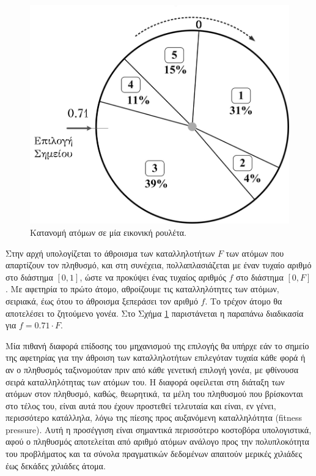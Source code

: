 \begin{figure}[htb]
 \begin{center}
    \includegraphics{./images/rouletteWheelSelection.png}
  \caption{Κατανομή ατόμων σε μία εικονική ρουλέτα.}
  \label{fig:rouletteWheelGA}
 \end{center}
\end{figure}





Στην αρχή υπολογίζεται το άθροισμα των καταλληλοτήτων $F$ των ατόμων που απαρτίζουν τον πληθυσμό, και στη συνέχεια, πολλαπλασιάζεται με έναν τυχαίο αριθμό στο διάστημα $[0,1]$, ώστε να προκύψει ένας τυχαίος αριθμός $f$ στο διάστημα $[0, F]$. Με αφετηρία το πρώτο άτομο, αθροίζουμε τις καταλληλότητες των ατόμων, σειριακά, έως ότου το άθροισμα ξεπεράσει τον αριθμό $f$. Το τρέχον άτομο θα αποτελέσει το ζητούμενο γονέα. Στο Σχήμα \ref{fig:rouletteWheelGA} παριστάνεται η παραπάνω διαδικασία για $f=0.71 \cdot F$.

Μία πιθανή διαφορά επίδοσης του μηχανισμού της επιλογής θα υπήρχε εάν το σημείο της αφετηρίας για την άθροιση των καταλληλοτήτων επιλεγόταν τυχαία κάθε φορά ή αν ο πληθυσμός ταξινομούταν πριν από κάθε γενετική επιλογή γονέα, με φθίνουσα σειρά καταλληλότητας των ατόμων του. Η διαφορά οφείλεται στη διάταξη των ατόμων στον πληθυσμό, καθώς, θεωρητικά, τα μέλη του πληθυσμού που βρίσκονται στο τέλος του, είναι αυτά που έχουν προστεθεί τελευταία και είναι, εν γένει, περισσότερο κατάλληλα, λόγω της πίεσης προς αυξανόμενη καταλληλότητα (fitness pressure). Αυτή η προσέγγιση είναι σημαντικά περισσότερο κοστοβόρα υπολογιστικά, αφού ο πληθυσμός αποτελείται από αριθμό ατόμων ανάλογο προς την πολυπλοκότητα του προβλήματος και τα σύνολα πραγματικών δεδομένων απαιτούν μερικές χιλιάδες έως δεκάδες χιλιάδες άτομα.

